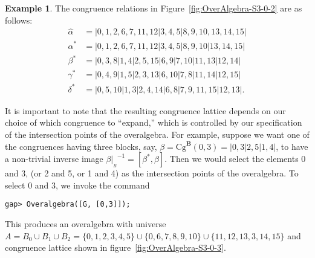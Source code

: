 \documentclass[cm,dissertation]{uhthesis}
\theoremstyle{plain}
\theoremstyle{definition}
\newtheorem{example}[theorem]{Example}
\theoremstyle{remark}
\numberwithin{theorem}{section}
\numberwithin{claim}{chapter}
\numberwithin{equation}{section}
\numberwithin{conjecture}{chapter}
\newcommand{\<}{\ensuremath{\langle}}
\renewcommand{\>}{\ensuremath{\rangle}}
\newcommand{\Cg}{\ensuremath{\mathrm{Cg}}}
\newcommand{\0}{\ensuremath{\mathbf{0}}}
\newcommand{\1}{\ensuremath{\mathbf{1}}}
\newcommand{\2}{\ensuremath{\mathbf{2}}}
\newcommand{\3}{\ensuremath{\mathbf{3}}}
\newcommand{\4}{\ensuremath{\mathbf{4}}}
\newcommand{\5}{\ensuremath{\mathbf{5}}}
\newcommand{\bB}{\ensuremath{\mathbf{B}}}
\newcommand{\resB}{\ensuremath{|_{_B}}}
\begin{document}
\begin{example}
  The congruence relations in Figure~\ref{fig:OverAlgebra-S3-0-2} are as follows:
  \begin{align*}
    \widehat{\alpha} &=|0,1,2,6,7,11,12|3,4,5|8,9,10,13,14,15| \\
    \alpha^* &=|0,1,2,6,7,11,12|3,4,5|8,9,10|13,14,15| \\
    \beta^*&=|0,3,8|1,4|2,5,15|6,9|7,10|11,13|12,14| \\
    \gamma^*&=|0,4,9|1,5|2,3,13|6,10|7,8|11,14|12,15| \\
    \delta^*&=|0,5,10|1,3|2,4,14|6,8|7,9,11,15|12,13|.
  \end{align*}

  It is important to note that the resulting congruence lattice depends
  on our choice of which congruence to ``expand,'' which is controlled by 
  our specification of the intersection points of the overalgebra.
  For example, suppose we want one of the congruences having three
  blocks, say, $\beta = \Cg^\bB(0,3) =| 0, 3 | 2, 5 | 1, 4 |$, to have a non-trivial
  inverse image $\beta\resB^{-1} = 
  [\beta^*, \widehat{\beta}]$.  Then we would select the elements 0
  and 3, (or 2 and 5, or 1 and 4) as the intersection points of the overalgebra.
  To select 0 and 3, we invoke the command 
  {\footnotesize
\begin{verbatim}
gap> Overalgebra([G, [0,3]]);
\end{verbatim}
  }

  \noindent This produces an overalgebra with universe
  $A = B_0 \cup B_1 \cup B_2
  = \{0, 1,  2,  3,  4,  5\} \cup \{ 0, 6,  7,  8,  9, 10\} \cup
  \{11, 12, 13, 3, 14, 15\}$
  and congruence lattice shown in figure~\ref{fig:OverAlgebra-S3-0-3}.


\end{example}
\end{document}

